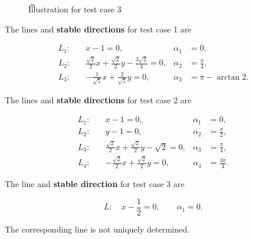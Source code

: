 \begin{figure}[h]
\begin{minipage}[t]{0.34\linewidth}
\begin{tikzpicture}[
			scale=0.72,
			>=Stealth,
			every node/.style={font=\scriptsize}
		]
		\end{tikzpicture}

		\vspace{1mm}

	\t{\scriptsize Illustration for test case 3}
	\end{minipage}

\end{figure}

The lines and \textbf{stable directions} for test case 1 are

\[
\begin{aligned}
L_1:\quad &x-1=0,
&\alpha_1&=0,\\
L_2:\quad &\frac{\sqrt{2}}{2}x+\frac{\sqrt{2}}{2}y-\frac{3\sqrt{2}}{4}=0,
&\alpha_2&=\frac{\pi}{4},\\
L_3:\quad &-\frac{1}{\sqrt{5}}x+\frac{2}{\sqrt{5}}y=0,
&\alpha_3&=\pi-\arctan 2.
\end{aligned}
\]



The lines and \textbf{stable directions} for test case 2 are

\[
\begin{aligned}
L_1:\quad &x-1=0,
&\alpha_1&=0,\\
L_2:\quad &y-1=0,
&\alpha_2&=\frac{\pi}{2},\\
L_3:\quad &\frac{\sqrt{2}}{2}x+\frac{\sqrt{2}}{2}y-\sqrt{2}=0,
&\alpha_3&=\frac{\pi}{4},\\
L_4:\quad &-\frac{\sqrt{2}}{2}x+\frac{\sqrt{2}}{2}y=0,
&\alpha_4&=\frac{3\pi}{4}.
\end{aligned}
\]

The line and \textbf{stable direction} for test case 3 are

\[
L:\quad x-\frac{1}{2}=0,
\qquad
\alpha_1=0.
\]

The corresponding line is not uniquely determined.
